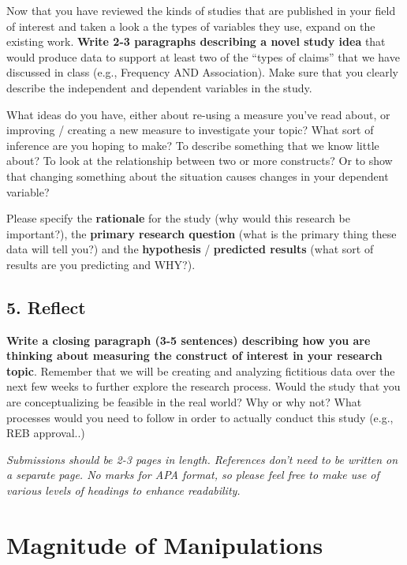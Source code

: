 \documentclass[
]{book}
\begin{document}
Now that you have reviewed the kinds of studies that are published in your field of interest and taken a look a the types of variables they use, expand on the existing work. \textbf{Write 2-3 paragraphs describing a novel study idea} that would produce data to support at least two of the ``types of claims'' that we have discussed in class (e.g., Frequency AND Association). Make sure that you clearly describe the independent and dependent variables in the study.

What ideas do you have, either about re-using a measure you've read about, or improving / creating a new measure to investigate your topic? What sort of inference are you hoping to make? To describe something that we know little about? To look at the relationship between two or more constructs? Or to show that changing something about the situation causes changes in your dependent variable?

Please specify the \textbf{rationale} for the study (why would this research be important?), the \textbf{primary research question} (what is the primary thing these data will tell you?) and the \textbf{hypothesis} / \textbf{predicted results} (what sort of results are you predicting and WHY?).

\section*{5. Reflect}\label{reflect-1}

\textbf{Write a closing paragraph (3-5 sentences) describing how you are thinking about measuring the construct of interest in your research topic}. Remember that we will be creating and analyzing fictitious data over the next few weeks to further explore the research process. Would the study that you are conceptualizing be feasible in the real world? Why or why not? What processes would you need to follow in order to actually conduct this study (e.g., REB approval..)

\emph{Submissions should be 2-3 pages in length. References don't need to be written on a separate page. No marks for APA format, so please feel free to make use of various levels of headings to enhance readability.}

\chapter{Magnitude of Manipulations}\label{magnitude-of-manipulations}
\end{document}
